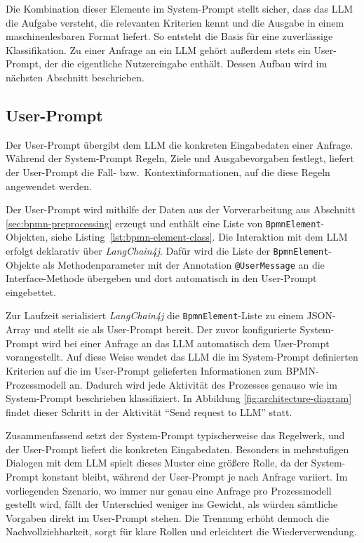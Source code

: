 Die Kombination dieser Elemente im System-Prompt stellt sicher, dass das \ac{LLM} die Aufgabe versteht, die relevanten Kriterien kennt und die Ausgabe in einem maschinenlesbaren Format liefert. So entsteht die Basis für eine zuverlässige Klassifikation. Zu einer Anfrage an ein \ac{LLM} gehört außerdem stets ein User-Prompt, der die eigentliche Nutzereingabe enthält. Dessen Aufbau wird im nächsten Abschnitt beschrieben.

\subsection*{User-Prompt}

Der User-Prompt übergibt dem \ac{LLM} die konkreten Eingabedaten einer Anfrage. Während der System-Prompt Regeln, Ziele und Ausgabevorgaben festlegt, liefert der User-Prompt die Fall- bzw.\ Kontextinformationen, auf die diese Regeln angewendet werden.

Der User-Prompt wird mithilfe der Daten aus der Vorverarbeitung aus Abschnitt \ref{sec:bpmn-preprocessing} erzeugt und enthält eine Liste von \texttt{BpmnElement}-Objekten, siehe Listing~\ref{lst:bpmn-element-class}. Die Interaktion mit dem \ac{LLM} erfolgt deklarativ über \emph{LangChain4j}. Dafür wird die Liste der \texttt{BpmnElement}-Objekte als Methodenparameter mit der Annotation \texttt{@UserMessage} an die Interface-Methode übergeben und dort automatisch in den User-Prompt eingebettet.

Zur Laufzeit serialisiert \emph{LangChain4j} die \texttt{BpmnElement}-Liste zu einem JSON-Array und stellt sie als User-Prompt bereit. Der zuvor konfigurierte System-Prompt wird bei einer Anfrage an das \ac{LLM} automatisch dem User-Prompt vorangestellt. Auf diese Weise wendet das \ac{LLM} die im System-Prompt definierten Kriterien auf die im User-Prompt gelieferten Informationen zum \ac{BPMN}-Prozessmodell an. Dadurch wird jede Aktivität des Prozesses genauso wie im System-Prompt beschrieben klassifiziert. In Abbildung \ref{fig:architecture-diagram} findet dieser Schritt in der Aktivität \enquote{Send request to LLM} statt.

Zusammenfassend setzt der System-Prompt typischerweise das Regelwerk, und der User-Prompt liefert die konkreten Eingabedaten. Besonders in mehrstufigen Dialogen mit dem \ac{LLM} spielt dieses Muster eine größere Rolle, da der System-Prompt konstant bleibt, während der User-Prompt je nach Anfrage variiert. Im vorliegenden Szenario, wo immer nur genau eine Anfrage pro Prozessmodell gestellt wird, fällt der Unterschied weniger ins Gewicht, als würden sämtliche Vorgaben direkt im User-Prompt stehen. Die Trennung erhöht dennoch die Nachvollziehbarkeit, sorgt für klare Rollen und erleichtert die Wiederverwendung.

